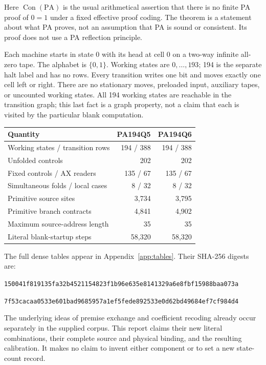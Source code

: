\documentclass[11pt,letterpaper]{article}
\newcommand{\PA}{\mathrm{PA}}
\newcommand{\Con}{\operatorname{Con}}
\begin{document}
Here $\Con(\PA)$ is the usual arithmetical assertion that there is no
finite PA proof of $0=1$ under a fixed effective proof coding. The theorem
is a statement about what PA proves, not an assumption that PA is sound or
consistent. Its proof does not use a PA reflection principle.

Each machine starts in state 0 with its head at cell 0 on a two-way
infinite all-zero tape. The alphabet is $\{0,1\}$. Working states are
$0,\ldots,193$; 194 is the separate halt label and has no rows. Every
transition writes one bit and moves exactly one cell left or right.
There are no stationary moves, preloaded input, auxiliary tapes, or
uncounted working states. All 194 working states are reachable in the
transition graph; this last fact is a graph property, not a claim that
each is visited by the particular blank computation.

\begin{center}
\begin{tabular}{@{}lrr@{}}\toprule
Quantity & PA194Q5 & PA194Q6\\\midrule
Working states / transition rows & 194 / 388 & 194 / 388\\
Unfolded controls & 202 & 202\\
Fixed controls / AX readers & 135 / 67 & 135 / 67\\
Simultaneous folds / local cases & 8 / 32 & 8 / 32\\
Primitive source sites & 3,734 & 3,795\\
Primitive branch contracts & 4,841 & 4,902\\
Maximum source-address length & 35 & 35\\
Literal blank-startup steps & 58,320 & 58,320\\
\bottomrule\end{tabular}
\end{center}

The full dense tables appear in Appendix~\ref{app:tables}. Their SHA-256
digests are:
\begin{description}[style=nextline]
\item[PA194Q5]
\nolinkurl{150041f819135fa32b4521154823f1b96e635e8141329a6e8fbf15988baa073a}
\item[PA194Q6]
\nolinkurl{7f53cacaa0533e601bad9685957a1ef5fede892533e0d62bd49684ef7cf984d4}
\end{description}

The underlying ideas of premise exchange and coefficient recoding already
occur separately in the supplied corpus. This report claims their new
literal combinations, their complete source and physical binding, and
the resulting calibration. It makes no claim to invent either component
or to set a new state-count record.
\end{document}
